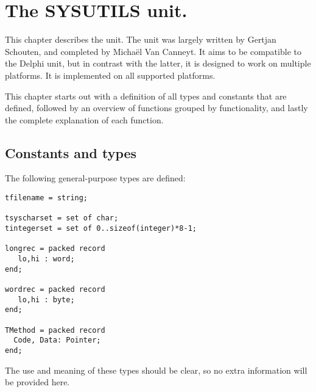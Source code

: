 %
%
%
%
%
\chapter{The SYSUTILS unit.}

This chapter describes the  unit. The  unit
was largely written by Gertjan Schouten, and completed by Micha\"el Van Canneyt.
It aims to be compatible to the Delphi  unit, but in contrast
with  the latter, it is designed to work on multiple platforms. It is implemented
on all supported platforms.

This chapter starts out with a definition of all types and constants
that are defined, followed by an overview of functions grouped by
functionality, and lastly the complete explanation of each function.

\section{Constants and types}
The following general-purpose types are defined:
\begin{verbatim}
tfilename = string;

tsyscharset = set of char;
tintegerset = set of 0..sizeof(integer)*8-1;

longrec = packed record
   lo,hi : word;
end;

wordrec = packed record
   lo,hi : byte;
end;

TMethod = packed record
  Code, Data: Pointer;
end;
\end{verbatim}
The use and meaning of these types should be clear, so no extra information
will be provided here.


